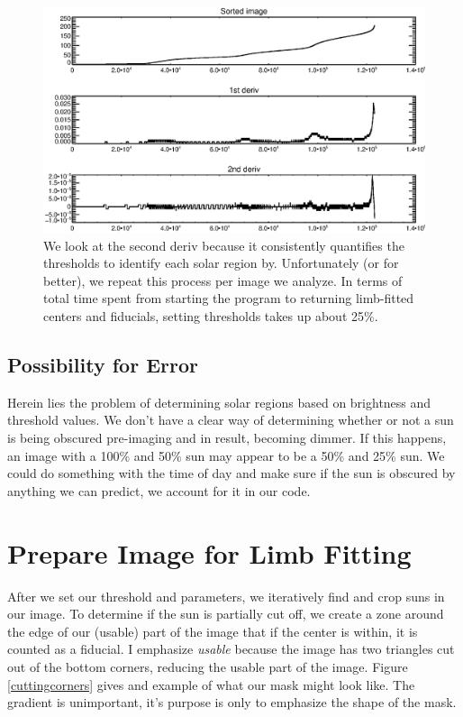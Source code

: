 \documentclass[10pt]{scrartcl}
\begin{document}
\begin{figure}[!ht]
    \centering
    \includegraphics[width=.9\textwidth]{../plots_tables_images/sortedarray.eps}    
    \caption{We look at the second deriv because it consistently quantifies the thresholds to identify each solar region by. Unfortunately (or for better), we repeat this process per image we analyze. In terms of total time spent from starting the program to returning limb-fitted centers and fiducials, setting thresholds takes up about 25\%.}
    \label{sortedarray}
\end{figure}

\subsection{Possibility for Error} %
\label{sub:possibility_for_error}
Herein lies the problem of determining solar regions based on brightness and threshold values. We don't have a clear way of determining whether or not a sun is being obscured pre-imaging and in result, becoming dimmer. If this happens, an image with a 100\% and 50\% sun may appear to be a 50\% and 25\% sun. We could do something with the time of day and make sure if the sun is obscured by anything we can predict, we account for it in our code. 


\section{Prepare Image for Limb Fitting} %
\label{sec:prepare_image_for_limb_fitting}
After we set our threshold and parameters, we iteratively find and crop suns in our image. To determine if the sun is partially cut off, we create a zone around the edge of our (usable) part of the image that if the center is within, it is counted as a fiducial. I emphasize \emph{usable} because the image has two triangles cut out of the bottom corners, reducing the usable part of the image. Figure \ref{cuttingcorners} gives and example of what our mask might look like. The gradient is unimportant, it's purpose is only to emphasize the shape of the mask.
\end{document}

